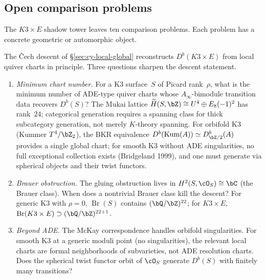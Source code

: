 \subsection{Open comparison problems}
\label{subsec:cy-research-programmes}

The $K3 \times E$ shadow tower leaves ten comparison problems.  Each
problem has a concrete geometric or automorphic object.

\bigskip

\begin{openproblem}
\label{op:programme-a-cy-gluing}
The \v{C}ech descent of
\S\ref{sec:cy-local-global} reconstructs $D^b(K3 \times E)$
from local quiver charts in principle. Three questions sharpen
the descent statement.
\begin{enumerate}[label=\textup{(\roman*)}]
\item \emph{Minimum chart number.} For a K3 surface~$S$ of
 Picard rank~$\rho$, what is the minimum number of
 ADE-type quiver charts whose $A_\infty$-bimodule
 transition data recovers $D^b(S)$? The Mukai lattice
 $\widetilde{H}(S,\bZ) \cong U^4 \oplus E_8(-1)^2$ has
 rank~$24$; categorical generation requires a spanning class
 for thick subcategory generation, not merely $K$-theory
 spanning. For orbifold K3 (Kummer $T^4/\bZ_2$),
 the BKR equivalence
 $D^b(\operatorname{Kum}(A)) \simeq D^b_{\bZ/2}(A)$
 provides a single global chart; for smooth K3 without
 ADE singularities, no full exceptional collection exists
 (Bridgeland 1999), and one must generate via spherical
 objects and their twist functors.
\item \emph{Brauer obstruction.} The gluing obstruction
 lives in $H^2(S, \cO_S) \cong \bC$
 (the Brauer class). When does a nontrivial Brauer
 class kill the descent? For generic K3 with $\rho = 0$,
 $\operatorname{Br}(S)$ contains $(\bQ/\bZ)^{22}$;
 for $K3 \times E$,
 $\operatorname{Br}(K3 \times E)
 \supset (\bQ/\bZ)^{22+1}$.
\item \emph{Beyond ADE.} The McKay correspondence
 handles orbifold singularities. For smooth K3 at a
 generic moduli point (no singularities), the relevant
 local charts are formal neighborhoods of subvarieties,
 not ADE resolution charts. Does the spherical twist
 functor orbit of $\cO_S$ generate $D^b(S)$ with
 finitely many transitions?
\end{enumerate}
\end{openproblem}

